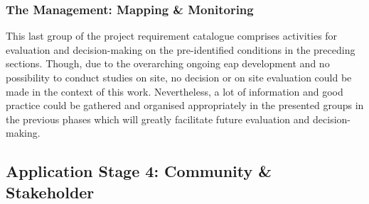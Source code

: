 \subsubsection*{The Management: Mapping \& Monitoring}

This last group of the project requirement catalogue comprises activities for evaluation and decision-making on the pre-identified conditions in the preceding sections. Though, due to the overarching ongoing \acrshort{eap} development and no possibility to conduct studies on site, no decision or on site evaluation could be made in the context of this work. Nevertheless, a lot of information and good practice could be gathered and organised appropriately in the presented groups in the previous phases which will greatly facilitate future evaluation and decision-making.\newline



\subsection{Application Stage 4: Community \& Stakeholder}\label{subsec:stage4_appl} %

